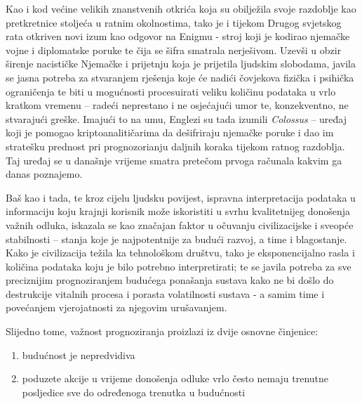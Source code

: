 \documentclass[a4paper,12pt,oneside]{memoir}
\begin{document}
        Kao i kod većine velikih znanstvenih otkrića koja su obilježila svoje razdoblje kao pretkretnice stoljeća u ratnim okolnostima, tako je i tijekom Drugog svjetskog rata otkriven novi izum kao odgovor na Enigmu - stroj koji je kodirao njemačke vojne i diplomatske poruke te čija se šifra smatrala nerješivom. Uzevši u obzir širenje nacističke Njemačke i prijetnju koja je prijetila ljudskim slobodama, javila se jasna potreba za stvaranjem rješenja koje će nadići čovjekova fizička i psihička ograničenja te biti u mogućnosti procesuirati veliku količinu podataka u vrlo kratkom vremenu -- radeći neprestano i ne osjećajući umor te, konzekventno, ne stvarajući greške. Imajući to na umu, Englezi su tada izumili \textit{Colossus} -- uređaj koji je pomogao kriptoanalitičarima da dešifriraju njemačke poruke i dao im stratešku prednost pri prognozorianju daljnih koraka tijekom ratnog razdoblja. Taj uređaj se u današnje vrijeme smatra pretečom prvoga računala kakvim ga danas poznajemo.

        Baš kao i tada, te kroz cijelu ljudsku povijest, ispravna interpretacija podataka u informaciju koju krajnji korisnik može iskoristiti u svrhu kvalitetnijeg donošenja važnih odluka, iskazala se kao značajan faktor u očuvanju civilizacijske i sveopće stabilnosti -- stanja koje je najpotentnije za budući razvoj, a time i blagostanje. Kako je civilizacija težila ka tehnološkom društvu, tako je eksponencijalno rasla i količina podataka koju je bilo potrebno interpretirati; te se javila potreba za sve preciznijim prognoziranjem budućega ponašanja sustava kako ne bi došlo do destrukcije vitalnih procesa i porasta volatilnosti sustava - a samim time i povećanjem vjerojatnosti za njegovim urušavanjem.

        Slijedno tome, važnost prognoziranja proizlazi iz dvije osnovne činjenice:
        \begin{enumerate}
            \item budućnost je nepredvidiva
            \item poduzete akcije u vrijeme donošenja odluke vrlo često nemaju trenutne posljedice sve do određenoga trenutka u budućnosti
        \end{enumerate}
\end{document}
